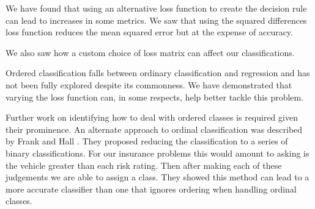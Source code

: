 We have found that using an alternative loss function to create the decision rule can lead to increases in some metrics.
We saw that using the squared differences loss function reduces the mean squared error but at the expense of accuracy.

We also saw how a custom choice of loss matrix can affect our classifications.

Ordered classification falls between ordinary classification and regression and has not been fully explored despite its commonness.
We have demonstrated that varying the loss function can, in some respects, help better tackle this problem.

Further work on identifying how to deal with ordered classes is required given their prominence.
An alternate approach to ordinal classification was described by Frank and Hall \cite{Frank01}.
They proposed reducing the classification to a series of binary classifications.
For our insurance problems this would amount to asking is the vehicle greater than each risk rating.
Then after making each of these judgements we are able to assign a class.
They showed this method can lead to a more accurate classifier than one that ignores ordering when handling ordinal classes.